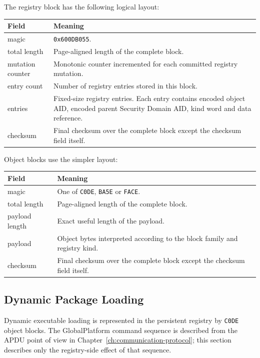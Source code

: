 The registry block has the following logical layout:

\begin{center}
\begin{tabular}{|l|p{8.5cm}|}
\hline
\textbf{Field} & \textbf{Meaning} \\
\hline
magic & \texttt{0x600DB055}. \\
\hline
total length & Page-aligned length of the complete block. \\
\hline
mutation counter & Monotonic counter incremented for each committed
registry mutation. \\
\hline
entry count & Number of registry entries stored in this block. \\
\hline
entries & Fixed-size registry entries. Each entry contains encoded object
AID, encoded parent Security Domain AID, kind word and data reference. \\
\hline
checksum & Final checksum over the complete block except the checksum field
itself. \\
\hline
\end{tabular}
\end{center}

Object blocks use the simpler layout:

\begin{center}
\begin{tabular}{|l|p{8.5cm}|}
\hline
\textbf{Field} & \textbf{Meaning} \\
\hline
magic & One of \texttt{C0DE}, \texttt{BA5E} or \texttt{FACE}. \\
\hline
total length & Page-aligned length of the complete block. \\
\hline
payload length & Exact useful length of the payload. \\
\hline
payload & Object bytes interpreted according to the block family and
registry kind. \\
\hline
checksum & Final checksum over the complete block except the checksum field
itself. \\
\hline
\end{tabular}
\end{center}

\subsection{Dynamic Package Loading}
\label{subsec:persistence-dynamic-package-loading}

Dynamic executable loading is represented in the persistent registry by
\texttt{C0DE} object blocks. The GlobalPlatform command sequence is described
from the APDU point of view in Chapter~\ref{ch:communication-protocol}; this
section describes only the registry-side effect of that sequence.


